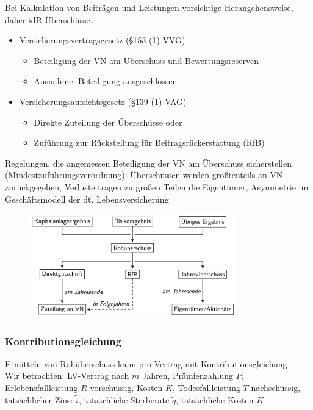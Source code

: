 \documentclass[12pt]{report}
\theoremstyle{dotless}
\theoremstyle{definition}
\begin{document}
Bei Kalkulation von Beiträgen und Leistungen vorsichtige Herangehensweise, daher idR Überschüsse.
\begin{itemize}
\item Versicherungsvertragsgesetz (§153 (1) VVG)
\begin{itemize}
\item Beteiligung der VN am Überschuss und Bewertungsreserven
\item Ausnahme: Beteiligung ausgeschlossen
\end{itemize}
\item Versicherungsaufsichtsgesetz (§139 (1) VAG)
\begin{itemize}
\item Direkte Zuteilung der Überschüsse oder
\item Zuführung zur Rückstellung für Beitragsrückerstattung (RfB)
\end{itemize}
\end{itemize}
Regelungen, die angemessen Beteiligung der VN am Überschuss sicherstellen (Mindestzuführungsverordnung): Überschüssen werden größtenteils an VN zurückgegeben, Verluste tragen zu großen Teilen die Eigentümer, Asymmetrie im Geschäftsmodell der dt. Lebensversicherung

\begin{figure}[ht]
	\centering
	\includegraphics[width= 0.8\textwidth]{Bilder/Ueberschuss.png}
\end{figure}

\subsubsection{Kontributionsgleichung}
Ermitteln von Rohüberschuss kann pro Vertrag mit Kontributionsgleichung \\
Wir betrachten: LV-Vertrag nach $m$ Jahren, Prämienzahlung $P$, Erlebensfallleistung $R$ vorschüssig, Kosten $K$, Todesfallleistung $T$ nachschüssig, tatsächlicher Zins: $\widetilde{i}$, tatsächliche Sterberate $\widetilde{q}$, tatsächliche Kosten $\widetilde{K}$
\end{document}
